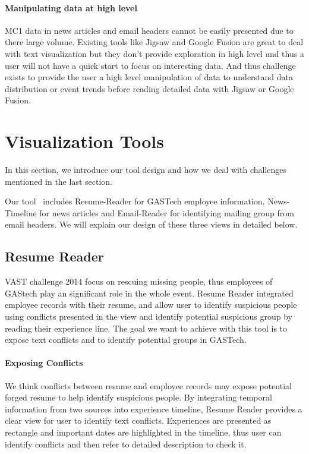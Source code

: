\documentclass{vgtc}                          %
\begin{document}
\paragraph{Manipulating data at high level}
MC1 data in news articles and email headers cannot be easily presented due to there large volume. Existing tools like Jigsaw and Google Fusion are great to deal with text visualization but they don't provide exploration in high level and thus a user will not have a quick start to focus on interesting data. And thus challenge exists to provide the user a high level manipulation of data to understand data distribution or event trends before reading detailed data with Jigsaw or Google Fusion.

\section{Visualization Tools}
In this section, we introduce our tool design and how we deal with challenges mentioned in the last section.
\par
Our tool \projectname\ includes Resume-Reader for GASTech employee information, News-Timeline for news articles and Email-Reader for identifying mailing group from email headers. We will explain our design of these three views in detailed below.
\subsection{Resume Reader}
VAST challenge 2014 focus on rescuing missing people, thus employees of GAStech play an significant role in the whole event. Resume Reader integrated employee records with their resume, and allow user to identify suspicious people using conflicts presented in the view and identify potential suspicious group by reading their experience line. The goal we want to achieve with this tool is to expose text conflicts and to identify potential groups in GASTech.
\paragraph{Exposing Conflicts}
We think conflicts between resume and employee records may expose potential forged resume to help identify suspicious people. By integrating temporal information from two sources into experience timeline, Resume Reader provides a clear view for user to identify text conflicts. Experiences are presented as rectangle and important dates are highlighted in the timeline, thus user can identify conflicts and then refer to detailed description to check it.
\end{document}
